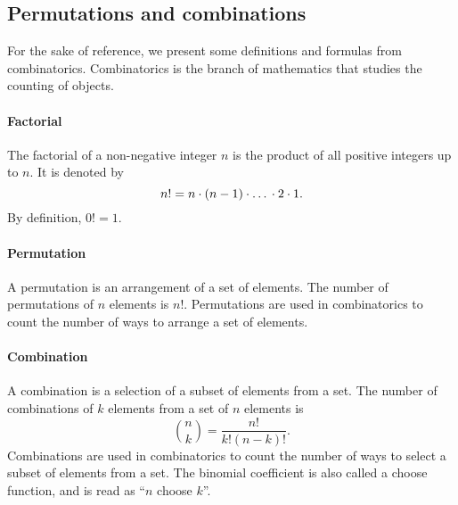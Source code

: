 \subsection{Permutations and combinations}

For the sake of reference, we present some definitions and formulas from
combinatorics. Combinatorics is the branch of mathematics that studies the counting of
objects.

\paragraph{Factorial}  The factorial of a non-negative integer $n$ is the product of all
positive integers up to $n$.  It is denoted by
\[
  n! = n \cdot (n - 1) \cdot \text\dots \cdot 2 \cdot 1\text{.}
\]
By definition, $0! = 1$.

\paragraph{Permutation}  A permutation is an arrangement of a set of elements.  The
number of permutations of $n$ elements is $n!$.  Permutations are used in combinatorics
to count the number of ways to arrange a set of elements.

\paragraph{Combination}  A combination is a selection of a subset of elements from a set.
The number of combinations of $k$ elements from a set of $n$ elements is $$\binom{n}{k} =
\frac{n!}{k!(n - k)!}\text{.}$$  Combinations are used in combinatorics to count the
number of ways to select a subset of elements from a set.  The binomial coefficient
is also called a choose function, and is read as ``$n$ choose $k$''.

